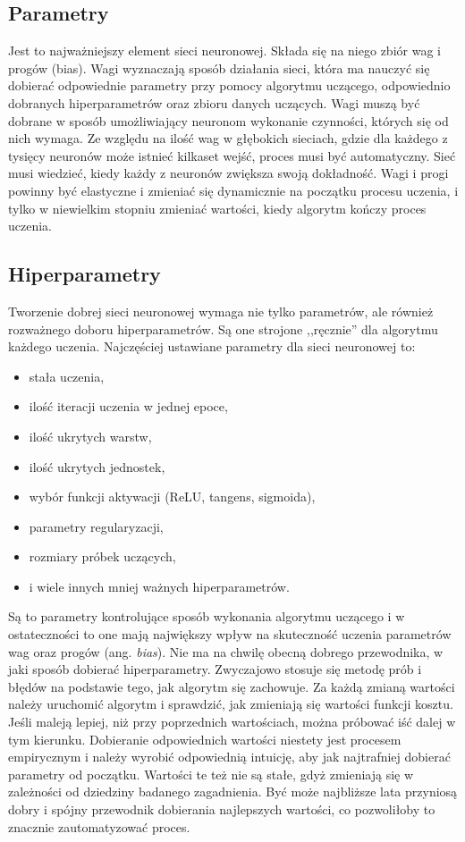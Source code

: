 \documentclass[12pt,a4paper,twoside,titlepage,openright]{book}
\begin{document}
\subsection{Parametry}
Jest to najważniejszy element sieci neuronowej. Składa się na niego zbiór wag i progów (bias). Wagi wyznaczają sposób działania sieci, która ma nauczyć się dobierać odpowiednie parametry przy pomocy algorytmu uczącego, odpowiednio dobranych hiperparametrów oraz zbioru danych uczących. Wagi muszą być dobrane w sposób umożliwiający neuronom wykonanie czynności, których się od nich wymaga. Ze względu na ilość wag w głębokich sieciach, gdzie dla każdego z tysięcy neuronów może istnieć kilkaset wejść, proces musi być automatyczny. Sieć musi wiedzieć, kiedy każdy z neuronów zwiększa swoją dokładność. Wagi i progi powinny być elastyczne i zmieniać się dynamicznie na początku procesu uczenia, i tylko w niewielkim stopniu zmieniać wartości, kiedy algorytm kończy proces uczenia.

\subsection{Hiperparametry}
Tworzenie dobrej sieci neuronowej wymaga nie tylko parametrów, ale również rozważnego doboru hiperparametrów. Są one strojone ,,ręcznie'' dla algorytmu każdego uczenia. Najczęściej ustawiane parametry dla sieci neuronowej to:
\begin{itemize}
\item stała uczenia,
\item ilość iteracji uczenia w jednej epoce,
\item ilość ukrytych warstw,
\item ilość ukrytych jednostek,
\item wybór funkcji aktywacji (ReLU, tangens, sigmoida),
\item parametry regularyzacji,
\item rozmiary próbek uczących,
\item i wiele innych mniej ważnych hiperparametrów.
\end{itemize}

Są to parametry kontrolujące sposób wykonania algorytmu uczącego i w ostateczności to one mają największy wpływ na skuteczność uczenia parametrów wag oraz progów (ang. \textit{bias}). Nie ma na chwilę obecną dobrego przewodnika, w jaki sposób dobierać hiperparametry. Zwyczajowo stosuje się metodę prób i błędów na podstawie tego, jak algorytm się zachowuje. \cite{sitefastAI} Za każdą zmianą wartości należy uruchomić algorytm i sprawdzić, jak zmieniają się wartości funkcji kosztu. Jeśli maleją lepiej, niż przy poprzednich wartościach, można próbować iść dalej w tym kierunku. Dobieranie odpowiednich wartości niestety jest procesem empirycznym i należy wyrobić odpowiednią intuicję, aby jak najtrafniej dobierać parametry od początku. Wartości te też nie są stałe, gdyż zmieniają się w zależności od dziedziny badanego zagadnienia. Być może najbliższe lata przyniosą dobry i spójny przewodnik dobierania najlepszych wartości, co pozwoliłoby to znacznie zautomatyzować proces.
\end{document}
